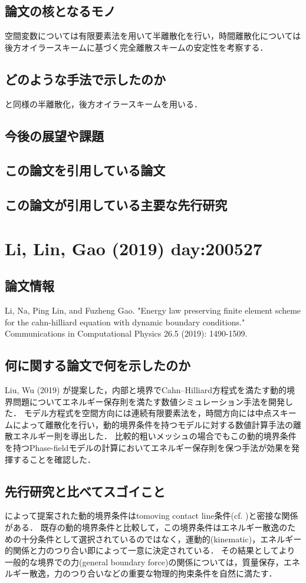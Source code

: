 \documentclass[openary, a4paper, oneside]{jsarticle}
\begin{document}
  \subsection{論文の核となるモノ}
  空間変数については有限要素法を用いて半離散化を行い，時間離散化については後方オイラースキームに基づく完全離散スキームの安定性を考察する．
  \subsection{どのような手法で示したのか}
  \cite{CherfilsPetcuPierre2010}と同様の半離散化，後方オイラースキームを用いる．
  \subsection{今後の展望や課題}
  \subsection{この論文を引用している論文}
  \subsection{この論文が引用している主要な先行研究}

\newpage
\section{Li, Lin, Gao (2019) day:200527}
  \subsection{論文情報}
  Li, Na, Ping Lin, and Fuzheng Gao. "Energy law preserving finite element scheme for the cahn-hilliard equation with dynamic boundary conditions." Communications in Computational Physics 26.5 (2019): 1490-1509.
  \subsection{何に関する論文で何を示したのか}
  Liu, Wu (2019) \cite{LiuWu2019} が提案した，内部と境界でCahn--Hilliard方程式を満たす動的境界問題についてエネルギー保存則を満たす数値シミュレーション手法を開発した．
  モデル方程式を空間方向には連続有限要素法を，時間方向には中点スキームによって離散化を行い，動的境界条件を持つモデルに対する数値計算手法の離散エネルギー則を導出した．
  比較的粗いメッシュの場合でもこの動的境界条件を持つPhase-fieldモデルの計算においてエネルギー保存則を保つ手法が効果を発揮することを確認した．
  \subsection{先行研究と比べてスゴイこと}
  \cite{LiuWu2019}によって提案された動的境界条件はtomoving contact line条件(cf. )と密接な関係がある．
  既存の動的境界条件と比較して，この境界条件はエネルギー散逸のための十分条件として選択されているのではなく，運動的(kinematic)，エネルギー的関係と力のつり合い即によって一意に決定されている．
  その結果としてより一般的な境界での力(general boundary force)の関係については，質量保存，エネルギー散逸，力のつり合いなどの重要な物理的拘束条件を自然に満たす．
\end{document}
